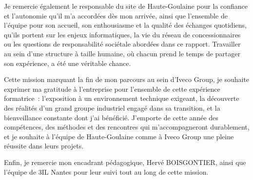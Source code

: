 \documentclass[12pt,a4paper]{article}
\newcommand{\MONECOLE}{3IL Nantes}
\newcommand{\MONENCADRANT}{Hervé BOISGONTIER}
\begin{document}
Je remercie également le responsable du site de Haute-Goulaine pour la confiance et l'autonomie qu'il m'a accordées dès mon arrivée, ainsi que l'ensemble de l'équipe pour son accueil, son enthousiasme et la qualité des échanges quotidiens, qu'ils portent sur les enjeux informatiques, la vie du réseau de concessionnaires ou les questions de responsabilité sociétale abordées dans ce rapport. Travailler au sein d'une structure à taille humaine, où chacun prend le temps de partager son expérience, a été une véritable chance.

Cette mission marquant la fin de mon parcours au sein d'Iveco Group, je souhaite exprimer ma gratitude à l'entreprise pour l'ensemble de cette expérience formatrice~: l'exposition à un environnement technique exigeant, la découverte des réalités d'un grand groupe industriel engagé dans sa transition, et la bienveillance constante dont j'ai bénéficié. J'emporte de cette année des compétences, des méthodes et des rencontres qui m'accompagneront durablement, et je souhaite à l'équipe de Haute-Goulaine comme à Iveco Group une pleine réussite dans leurs projets.

Enfin, je remercie mon encadrant pédagogique, \MONENCADRANT, ainsi que l'équipe de \MONECOLE{} pour leur suivi tout au long de cette mission.

\newpage

\tableofcontents
\newpage


\newpage


\newpage



\newpage


\newpage
\end{document}
